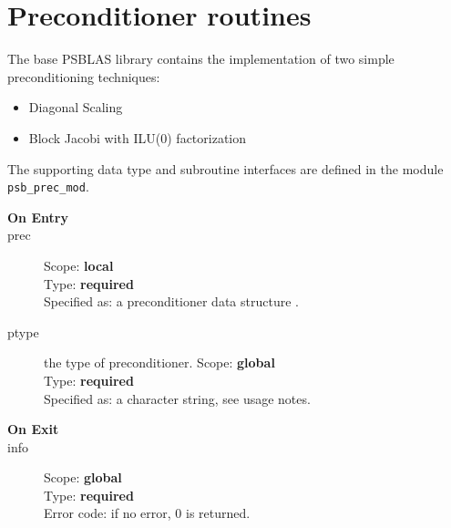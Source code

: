 \section{Preconditioner routines}
\label{sec:precs}

\label{sec:psprecs}
The base PSBLAS library  contains the implementation of two simple
preconditioning techniques:
\begin{itemize}
\item Diagonal Scaling
\item Block Jacobi with ILU(0) factorization
\end{itemize}
The supporting data type and subroutine interfaces are defined in the
module  \verb|psb_prec_mod|.







\begin{description}
\item[\bf On Entry]
\item[prec] 
Scope: {\bf local} \\
Type: {\bf required}\\
Specified as: a preconditioner data structure \precdata.
\item[ptype] the type of preconditioner. 
Scope: {\bf global} \\
Type: {\bf required}\\
Specified as: a character string, see usage notes.
\item[\bf On Exit]

\item[info] 
Scope: {\bf global} \\
Type: {\bf required}\\
Error code: if no error, 0 is returned.
\end{description}
